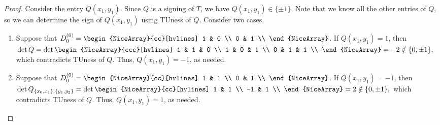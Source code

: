 \documentclass{article}
\theoremstyle{definition}
\begin{document}
\begin{proof}
    Consider the entry $Q (x_{1}, y_{1})$. Since $Q$ is a signing of $T$, we have $Q (x_{1}, y_{1}) \in \{\pm 1\}$. Note that we know all the other entries of $Q$, so we can determine the sign of $Q (x_{1}, y_{1})$ using TUness of $Q$. Consider two cases.
    \begin{enumerate}
        \item Suppose that $D_{0}^{(0)} = \begin{NiceArray}{cc}[hvlines] 1 & 0 \\ 0 & 1 \\ \end{NiceArray}$. If $Q (x_{1}, y_{1}) = 1$, then
        $
            \det Q = \det \begin{NiceArray}{ccc}[hvlines]
                1 & 1 & 0 \\
                1 & 0 & 1 \\
                0 & 1 & 1 \\
            \end{NiceArray} = -2 \notin \{0, \pm 1\},
        $
        which contradicts TUness of $Q$. Thus, $Q (x_{1}, y_{1}) = -1$, as needed.
        \item Suppose that $D_{0}^{(0)} = \begin{NiceArray}{cc}[hvlines] 1 & 1 \\ 0 & 1 \\ \end{NiceArray}$. If $Q (x_{1}, y_{1}) = -1$, then
        $
            \det Q_{\{x_{0}, x_{1}\}, \{y_{1}, y_{2}\}} = \det \begin{NiceArray}{cc}[hvlines]
                1 & 1 \\
                -1 & 1 \\
            \end{NiceArray} = 2 \notin \{0, \pm 1\},
        $
        which contradicts TUness of $Q$. Thus, $Q (x_{1}, y_{1}) = 1$, as needed.
    \end{enumerate}
\end{proof}
\end{document}
